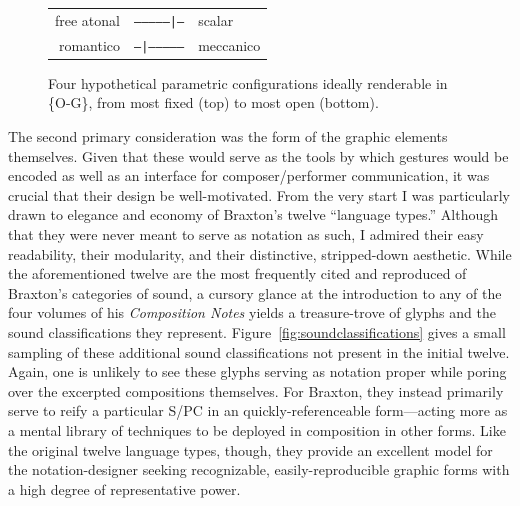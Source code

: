 \begin{figure}
            \vspace{7pt}
        
            \begin{tabular}{|r c l|}
                \hline
                free atonal & \texttt{--------------|--} & scalar \\
                romantico & \texttt{--|--------------} & meccanico \\
                \hline
            \end{tabular}
        
        \captionsetup{width=.5\textwidth}
        \caption{Four hypothetical parametric configurations ideally renderable in \{O-G\}, from most fixed (top) to most open (bottom).}
        \label{fig:sliders}
        \end{figure}

    The second primary consideration was the form of the graphic elements themselves. Given that these would serve as the tools by which gestures would be encoded as well as an interface for composer/performer communication, it was crucial that their design be well-motivated. From the very start I was particularly drawn to elegance and economy of Braxton's twelve ``language types.'' Although that they were never meant to serve as notation as such, I admired their easy readability, their modularity, and their distinctive, stripped-down aesthetic. While the aforementioned twelve are the most frequently cited and reproduced of Braxton's categories of sound, a cursory glance at the introduction to any of the four volumes of his \textit{Composition Notes} yields a treasure-trove of glyphs and the sound classifications they represent. Figure~\ref{fig:soundclassifications} gives a small sampling of these additional sound classifications not present in the initial twelve. Again, one is unlikely to see these glyphs serving as notation proper while poring over the excerpted compositions themselves. For Braxton, they instead primarily serve to reify a particular S/PC in an quickly-referenceable form---acting more as a mental library of techniques to be deployed in composition in other forms. Like the original twelve language types, though, they provide an excellent model for the notation-designer seeking recognizable, easily-reproducible graphic forms with a high degree of representative power.

